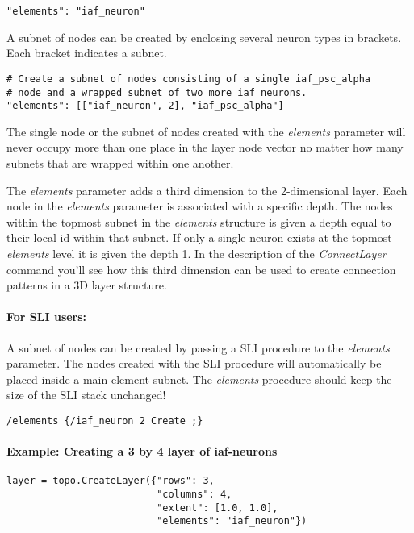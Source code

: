 \documentclass{article}
\begin{document}
\begin{verbatim}
"elements": "iaf_neuron"
\end{verbatim}

\noindent A subnet of nodes can be created by enclosing several neuron types in brackets. Each bracket indicates a subnet.

\begin{verbatim}
# Create a subnet of nodes consisting of a single iaf_psc_alpha 
# node and a wrapped subnet of two more iaf_neurons.
"elements": [["iaf_neuron", 2], "iaf_psc_alpha"]
\end{verbatim}

\noindent The single node or the subnet of nodes created with the \emph{elements} parameter will never occupy more than one place in the layer node vector no matter how many subnets that are wrapped within one another.

The \emph{elements} parameter adds a third dimension to the 2-dimensional layer. Each node in the \emph{elements} parameter is associated with a specific depth. The nodes within the topmost subnet in the \emph{elements} structure is given a depth equal to their local id within that subnet. If only a single neuron exists at the topmost \emph{elements} level it is given the depth 1. In the description of the \emph{ConnectLayer} command you'll see how this third dimension can be used to create connection patterns in a 3D layer structure. 

\paragraph{For SLI users:}

\noindent A subnet of nodes can be created by passing a SLI procedure to the \emph{elements} parameter. The nodes created with the SLI procedure will automatically be placed inside a main element subnet. The \emph{elements} procedure should keep the size of the SLI stack unchanged!

\begin{verbatim}
/elements {/iaf_neuron 2 Create ;}
\end{verbatim}

\paragraph{Example: Creating a 3 by 4 layer of iaf-neurons}

\begin{verbatim}
layer = topo.CreateLayer({"rows": 3,
                          "columns": 4,
                          "extent": [1.0, 1.0],
                          "elements": "iaf_neuron"})
\end{verbatim}
\end{document}
